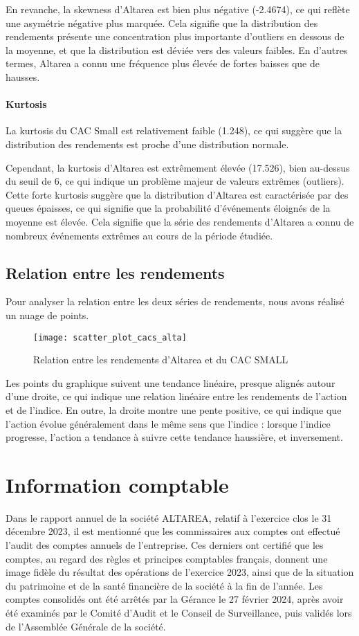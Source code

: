 \documentclass[a4paper, 12pt]{report}
\begin{document}
En revanche, la skewness d'Altarea est bien plus négative (-2.4674), ce qui reflète une asymétrie négative plus marquée. Cela signifie que la distribution des rendements présente une concentration plus importante d'outliers en dessous de la moyenne, et que la distribution est déviée vers des valeurs faibles. En d'autres termes, Altarea a connu une fréquence plus élevée de fortes baisses que de hausses.

\subsubsection{Kurtosis}
\noindent
La kurtosis du CAC Small est relativement faible (1.248), ce qui suggère que la distribution des rendements est proche d'une distribution normale.

Cependant, la kurtosis d'Altarea  est extrêmement élevée (17.526), bien au-dessus du seuil de 6, ce qui indique un problème majeur de valeurs extrêmes (outliers). Cette forte kurtosis suggère que la distribution d'Altarea est caractérisée par des queues épaisses, ce qui signifie que la probabilité d'événements éloignés de la moyenne est élevée. Cela signifie que la série des rendements d'Altarea  a connu de nombreux événements extrêmes au cours de la période étudiée.

\section{Relation entre les rendements}
\noindent
Pour analyser la relation entre les deux séries de rendements, nous avons réalisé un nuage de points. 
\begin{figure}[H]
\begin{center}
	\texttt{[image: scatter\_plot\_cacs\_alta]}
	\caption{Relation entre les rendements d'Altarea et du CAC SMALL}
\end{center}
\end{figure}
Les points du graphique suivent une tendance linéaire, presque alignés autour d'une droite, ce qui indique une relation linéaire entre les rendements de l'action et de l'indice. 
En outre, la droite montre une pente positive, ce qui indique que l'action évolue généralement dans le même sens que l'indice : lorsque l'indice progresse, l'action a tendance à suivre cette tendance haussière, et inversement.

\chapter{Information comptable}
\noindent
Dans le rapport annuel de la société ALTAREA, relatif à l'exercice clos le 31 décembre 2023, il est mentionné que les commissaires aux comptes ont effectué l'audit des comptes annuels de l'entreprise. 
Ces derniers ont certifié que les comptes, au regard des règles et principes comptables français, donnent une image fidèle du résultat des opérations de l'exercice 2023, ainsi que de la situation du patrimoine et de la santé financière de la société à la fin de l'année. 
Les comptes consolidés ont été arrêtés par la Gérance le 27 février 2024, après avoir été examinés par le Comité d'Audit et le Conseil de Surveillance, puis validés lors de l'Assemblée Générale de la société.
\end{document}
